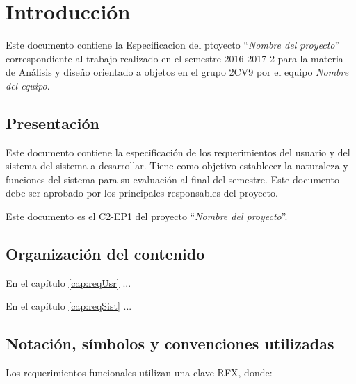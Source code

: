\chapter{Introducción}


	Este documento contiene la Especificacion del ptoyecto ``{\em Nombre del proyecto}'' correspondiente al trabajo realizado en el semestre 2016-2017-2 para la materia de Análisis y diseño orientado a objetos en el grupo 2CV9 por el equipo {\em Nombre del equipo}.

\section{Presentación}


	Este documento contiene la especificación de los requerimientos del usuario y del sistema del sistema a desarrollar. Tiene como objetivo establecer la naturaleza y funciones del sistema para su evaluación al final del semestre. Este documento debe ser aprobado por los principales responsables del proyecto.
	
	Este documento es el C2-EP1 del proyecto ``{\em Nombre del proyecto}''.
	
\section{Organización del contenido}

	En el capítulo \ref{cap:reqUsr} ...
	
	En el capítulo \ref{cap:reqSist} ...

\section{Notación, símbolos y convenciones utilizadas}

	Los requerimientos funcionales utilizan una clave RFX, donde:
	
